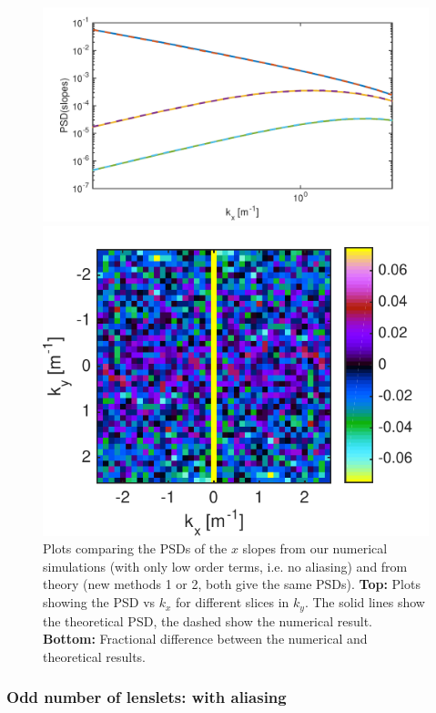 \documentclass[pdf]{note}
\begin{document}
\begin{figure}[htdp]
    \centerline{
      \includegraphics[scale=0.7]{plots/psdLOSlopesX_num_theory2_comp}
   }
    \centerline{   
      \includegraphics[scale=0.7]{plots/psdLOSlopesX_num_theory2_difference} 
    }
    \caption{Plots comparing the PSDs of the $x$ slopes from our numerical simulations
    		(with only low order terms, i.e. no aliasing)
    		and from theory (new methods 1 or 2, both give the same PSDs).  {\bf Top:}
		Plots showing the PSD vs $k_x$ for different slices in $k_y$.  The solid lines
		show the theoretical PSD, the dashed show the numerical result.
		{\bf Bottom:} Fractional difference between the numerical and theoretical
		results.  
    }
    \label{fig:PSDsSlopes}
\end{figure}

\newpage
\subsubsection{Odd number of lenslets: with aliasing}
\end{document}
